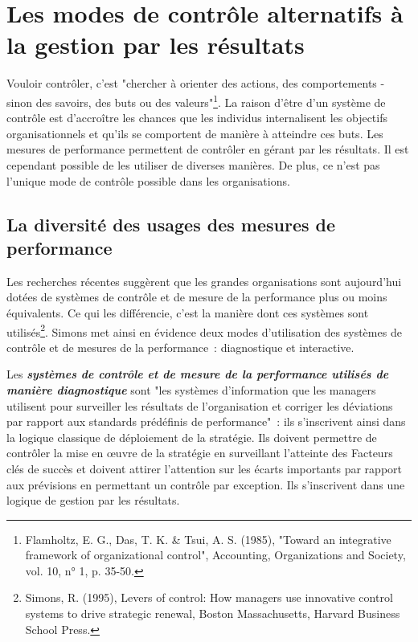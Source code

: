 \documentclass[oneside]{kaobook}
\begin{document}
\section{Les modes de contrôle alternatifs à la gestion par les résultats}
\label{sec:orgc5e3433}
Vouloir contrôler, c'est "chercher à orienter des actions, des comportements - sinon des savoirs, des buts ou des valeurs"\footnote{Flamholtz, E. G., Das, T. K. \& Tsui, A. S. (1985), "Toward an integrative framework of organizational control", Accounting, Organizations and Society, vol. 10, n° 1, p. 35-50.}. La raison d'être d'un système de contrôle est d'accroître les chances que les individus internalisent les objectifs organisationnels et qu'ils se comportent de manière à atteindre ces buts. Les mesures de performance permettent de contrôler en gérant par les résultats. Il est cependant possible de les utiliser de diverses manières. De plus, ce n'est pas l'unique mode de contrôle possible dans les organisations.
\subsection{La diversité des usages des mesures de performance}
\label{sec:orgb7a01d9}
Les recherches récentes suggèrent que les grandes organisations sont aujourd'hui dotées de systèmes de contrôle et de mesure de la performance plus ou moins équivalents. Ce qui les différencie, c'est la manière dont ces systèmes sont utilisés\footnote{Simons, R. (1995), Levers of control: How managers use innovative control systems to drive strategic renewal, Boston Massachusetts, Harvard Business School Press.}. Simons met ainsi en évidence deux modes d'utilisation des systèmes de contrôle et de mesures de la performance : diagnostique et interactive.

Les \emph{\textbf{systèmes de contrôle et de mesure de la performance utilisés de manière diagnostique}} sont "les systèmes d'information que les managers utilisent pour surveiller les résultats de l'organisation et corriger les déviations par rapport aux standards prédéfinis de performance" : ils s'inscrivent ainsi dans la logique classique de déploiement de la stratégie. Ils doivent permettre de contrôler la mise en œuvre de la stratégie en surveillant l'atteinte des Facteurs clés de succès et doivent attirer l'attention sur les écarts importants par rapport aux prévisions en permettant un contrôle par exception. Ils s'inscrivent dans une logique de gestion par les résultats.
\end{document}
